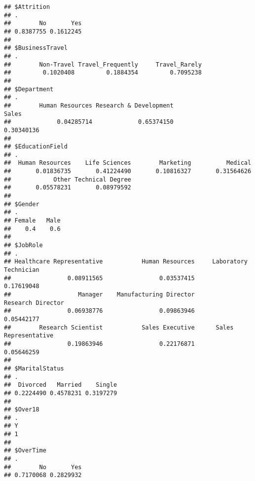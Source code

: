 \documentclass[
]{article}
\newenvironment{Shaded}{\begin{snugshade}}{\end{snugshade}}
\newcommand{\CommentTok}[1]{\textcolor[rgb]{0.56,0.35,0.01}{\textit{#1}}}
\newcommand{\KeywordTok}[1]{\textcolor[rgb]{0.13,0.29,0.53}{\textbf{#1}}}
\newcommand{\NormalTok}[1]{#1}
\newcommand{\OperatorTok}[1]{\textcolor[rgb]{0.81,0.36,0.00}{\textbf{#1}}}
\newcommand{\StringTok}[1]{\textcolor[rgb]{0.31,0.60,0.02}{#1}}
\begin{document}
\begin{Shaded}
\end{Shaded}

\begin{verbatim}
## $Attrition
## .
##        No       Yes 
## 0.8387755 0.1612245 
## 
## $BusinessTravel
## .
##        Non-Travel Travel_Frequently     Travel_Rarely 
##         0.1020408         0.1884354         0.7095238 
## 
## $Department
## .
##        Human Resources Research & Development                  Sales 
##             0.04285714             0.65374150             0.30340136 
## 
## $EducationField
## .
##  Human Resources    Life Sciences        Marketing          Medical 
##       0.01836735       0.41224490       0.10816327       0.31564626 
##            Other Technical Degree 
##       0.05578231       0.08979592 
## 
## $Gender
## .
## Female   Male 
##    0.4    0.6 
## 
## $JobRole
## .
## Healthcare Representative           Human Resources     Laboratory Technician 
##                0.08911565                0.03537415                0.17619048 
##                   Manager    Manufacturing Director         Research Director 
##                0.06938776                0.09863946                0.05442177 
##        Research Scientist           Sales Executive      Sales Representative 
##                0.19863946                0.22176871                0.05646259 
## 
## $MaritalStatus
## .
##  Divorced   Married    Single 
## 0.2224490 0.4578231 0.3197279 
## 
## $Over18
## .
## Y 
## 1 
## 
## $OverTime
## .
##        No       Yes 
## 0.7170068 0.2829932
\end{verbatim}

\begin{Shaded}
\end{Shaded}
\end{document}
